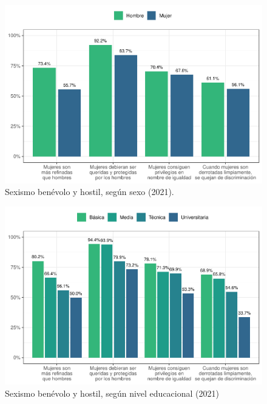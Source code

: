 \documentclass[
  12pt,
]{book}
\begin{document}
\begin{figure}

{\centering \includegraphics{reporte-elsoc_files/figure-latex/sexismo-sexo-1} 

}

\caption{Sexismo benévolo y hostil, según sexo (2021).}\label{fig:sexismo-sexo}
\end{figure}

\begin{figure}

{\centering \includegraphics{reporte-elsoc_files/figure-latex/sexismo-educ-1} 

}

\caption{Sexismo benévolo y hostil, según nivel educacional (2021)}\label{fig:sexismo-educ}
\end{figure}
\end{document}
